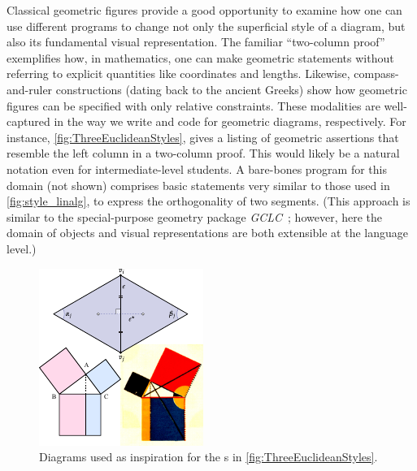 Classical geometric figures provide a good opportunity to examine how one can use different \Style{} programs to change not only the superficial style of a diagram, but also its fundamental visual representation.  The familiar ``two-column proof'' exemplifies how, in mathematics, one can make geometric statements without referring to explicit quantities like coordinates and lengths.  Likewise, compass-and-ruler constructions (dating back to the ancient Greeks) show how geometric figures can be specified with only relative constraints.  These modalities are well-captured in the way we write \Substance{} and \Style{} code for geometric diagrams, respectively.  For instance, \cref{fig:ThreeEuclideanStyles},  gives a listing of geometric assertions that resemble the left column in a two-column proof. This would likely be a natural notation even for intermediate-level students.  A bare-bones \Style{} program for this domain (not shown) comprises basic statements very similar to those used in \cref{fig:style_linalg}, \eg to express the orthogonality of two segments.  (This approach is similar to the special-purpose geometry package \emph{GCLC}~\cite{Janivcic:2006:GCLC}; however, here the domain of objects and visual representations are both extensible at the language level.)

\setlength{\columnsep}{1em}
\setlength{\intextsep}{0em}
\begin{figure}
   \includegraphics[width=\linewidth]{assets/penrose/EuclideanStyleInspiration.pdf}
   \caption{Diagrams used as inspiration for the \Style{}s in \cref{fig:ThreeEuclideanStyles}.}
 \end{figure}
\setlength{\intextsep}{1em}


